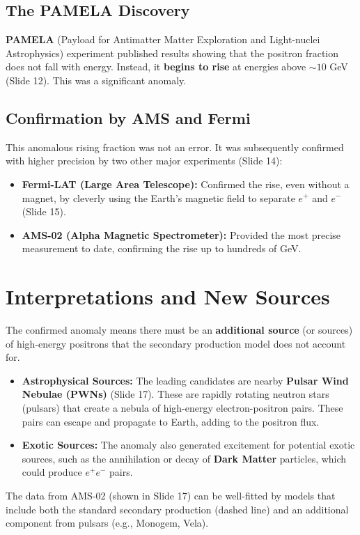 \documentclass{sciposter}
\begin{document}
\begin{multicols}{3}
\subsection{The PAMELA Discovery}
\textbf{PAMELA} (Payload for Antimatter Matter Exploration and Light-nuclei Astrophysics) experiment published results showing that the positron fraction does not fall with energy. Instead, it \textbf{begins to rise} at energies above $\sim 10$ GeV (Slide 12). This was a significant anomaly.

\subsection{Confirmation by AMS and Fermi}
This anomalous rising fraction was not an error. It was subsequently confirmed with higher precision by two other major experiments (Slide 14):
\begin{itemize}
    \item \textbf{Fermi-LAT (Large Area Telescope):} Confirmed the rise, even without a magnet, by cleverly using the Earth's magnetic field to separate $e^+$ and $e^-$ (Slide 15).
    \item \textbf{AMS-02 (Alpha Magnetic Spectrometer):} Provided the most precise measurement to date, confirming the rise up to hundreds of GeV.
\end{itemize}

\section{Interpretations and New Sources}
The confirmed anomaly means there must be an \textbf{additional source} (or sources) of high-energy positrons that the secondary production model does not account for.

\begin{itemize}
    \item \textbf{Astrophysical Sources:} The leading candidates are nearby \textbf{Pulsar Wind Nebulae (PWNs)} (Slide 17). These are rapidly rotating neutron stars (pulsars) that create a nebula of high-energy electron-positron pairs. These pairs can escape and propagate to Earth, adding to the positron flux.
    \item \textbf{Exotic Sources:} The anomaly also generated excitement for potential exotic sources, such as the annihilation or decay of \textbf{Dark Matter} particles, which could produce $e^+ e^-$ pairs.
\end{itemize}

The data from AMS-02 (shown in Slide 17) can be well-fitted by models that include both the standard secondary production (dashed line) and an additional component from pulsars (e.g., Monogem, Vela).


\end{multicols}
\end{document}
